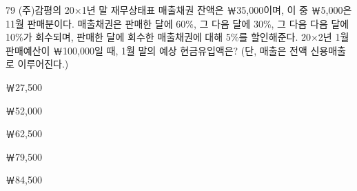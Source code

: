 \begin{question}{79}
(주)감평의 20×1년 말 재무상태표 매출채권 잔액은 ￦35,000이며, 이 중 ￦5,000은 11월 판매분이다. 매출채권은 판매한 달에 60\%, 그 다음 달에 30\%, 그 다음 다음 달에 10\%가 회수되며, 판매한 달에 회수한 매출채권에 대해 5\%를 할인해준다. 20×2년 1월 판매예산이 ￦100,000일 때, 1월 말의 예상 현금유입액은? (단, 매출은 전액 신용매출로 이루어진다.)
\begin{choices}
  \item ￦27,500
  \item ￦52,000
  \item ￦62,500
  \item ￦79,500
  \item ￦84,500
\end{choices}
\end{question}
